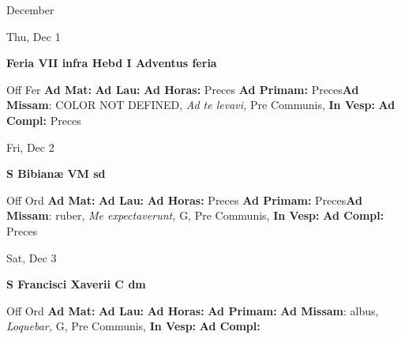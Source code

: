 \documentclass[10pt]{memoir}
\begin{document}
\begin{center}
\pagebreak
\thispagestyle{empty}
{\Huge December}
\end{center}
                    
\begin{center}
\begin{minipage}{3.5in}
\vspace{2em}
\begin{center}Thu, Dec 1
\end{center}
\textbf{ \large Feria VII infra Hebd I Adventus
\textnormal{\normalsize feria}}

\begin{justify}Off Fer
\textbf{Ad Mat: }
\textbf{Ad Lau: }
\textbf{Ad Horas: }Preces
\textbf{Ad Primam: }Preces\textbf{Ad Missam}: COLOR NOT DEFINED, \textit{Ad te levavi,} Pre Communis, 
\textbf{In Vesp: }
\textbf{Ad Compl: }Preces
\end{justify}
\end{minipage}
\end{center}

\begin{center}
\begin{minipage}{3.5in}
\vspace{2em}
\begin{center}Fri, Dec 2
\end{center}
\textbf{ \large S Bibianæ VM
\textnormal{\normalsize sd}}

\begin{justify}Off Ord
\textbf{Ad Mat: }
\textbf{Ad Lau: }
\textbf{Ad Horas: }Preces
\textbf{Ad Primam: }Preces\textbf{Ad Missam}: ruber, \textit{Me expectaverunt,} G, Pre Communis, 
\textbf{In Vesp: }
\textbf{Ad Compl: }Preces
\end{justify}
\end{minipage}
\end{center}

\begin{center}
\begin{minipage}{3.5in}
\vspace{2em}
\begin{center}Sat, Dec 3
\end{center}
\textbf{ \large S Francisci Xaverii C
\textnormal{\normalsize dm}}

\begin{justify}Off Ord
\textbf{Ad Mat: }
\textbf{Ad Lau: }
\textbf{Ad Horas: }
\textbf{Ad Primam: }\textbf{Ad Missam}: albus, \textit{Loquebar,} G, Pre Communis, 
\textbf{In Vesp: }
\textbf{Ad Compl: }
\end{justify}
\end{minipage}
\end{center}
\end{document}
